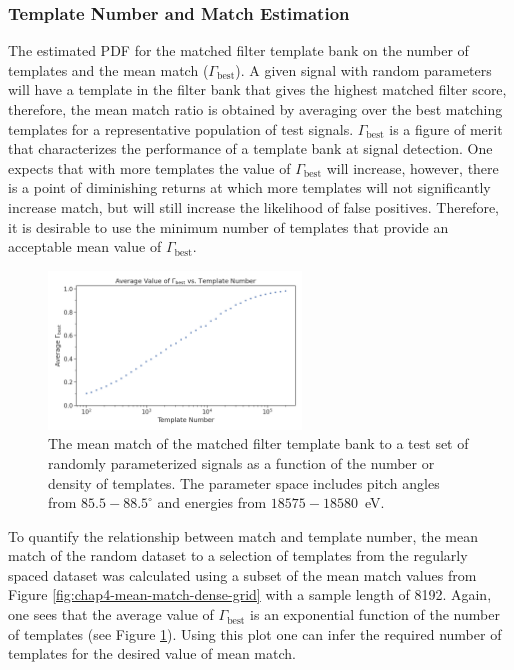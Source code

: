 \subsubsection{Template Number and Match Estimation}
The estimated PDF for the matched filter template bank on the number of templates and the mean match ($\Gamma_\mathrm{best}$). A given signal with random parameters will have a template in the filter bank that gives the highest matched filter score, therefore, the mean match ratio is obtained by averaging over the best matching templates for a representative population of test signals. $\Gamma_\mathrm{best}$ is a figure of merit that characterizes the performance of a template bank at signal detection. One expects that with more templates the value of $\Gamma_\mathrm{best}$ will increase, however, there is a point of diminishing returns at which more templates will not significantly increase match, but will still increase the likelihood of false positives. Therefore, it is desirable to use the minimum number of templates that provide an acceptable mean value of $\Gamma_\mathrm{best}$.
\begin{figure}[htbp]
    \centering
    \includegraphics[width=0.6\textwidth]{figs/Chapter-4/230426_mean_match_vs_templates.png}
    \caption{The mean match of the matched filter template bank to a test set of randomly parameterized signals as a function of the number or density of templates. The parameter space includes pitch angles from $85.5-88.5^\circ$ and energies from $18575-18580$~eV.}
    \label{fig:match_vs_template_number}
\end{figure}

To quantify the relationship between match and template number, the mean match of the random dataset to a selection of templates from the regularly spaced dataset was calculated using a subset of the mean match values from Figure \ref{fig:chap4-mean-match-dense-grid} with a sample length of 8192. Again, one sees that the average value of $\Gamma_\mathrm{best}$ is an exponential function of the number of templates (see Figure \ref{fig:match_vs_template_number}). Using this plot one can infer the required number of templates for the desired value of mean match.

